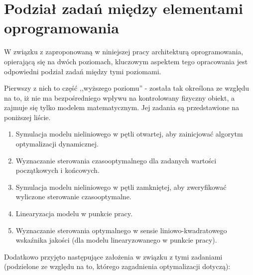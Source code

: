 \section{Podział zadań między elementami oprogramowania}
\label{sec:podzial-zadan}

W związku z zaproponowaną w niniejszej pracy architekturą oprogramowania, opierającą się na dwóch poziomach, kluczowym aspektem tego opracowania jest odpowiedni podział zadań między tymi poziomami.

Pierwszy z nich to część ,,wyższego poziomu'' - została tak określona ze względu na to, iż nie ma bezpośredniego wpływu na kontrolowany fizyczny obiekt, a zajmuje się tylko modelem matematycznym. Jej zadania są przedstawione na poniższej liście.

\begin{enumerate}
    \item Symulacja modelu nieliniowego w pętli otwartej, aby zainicjować algorytm optymalizacji dynamicznej.
    \item Wyznaczanie sterowania czasooptymalnego dla zadanych wartości początkowych i końcowych.
    \item Symulacja modelu nieliniowego w pętli zamkniętej, aby zweryfikować wyliczone sterowanie czasooptymalne.
    \item Linearyzacja modelu w punkcie pracy.
    \item Wyznaczanie sterowania optymalnego w sensie liniowo-kwadratowego wskaźnika jakości (dla modelu linearyzowanego w punkcie pracy).
\end{enumerate}

Dodatkowo przyjęto następujące założenia w związku z tymi zadaniami (podzielone ze względu na to, którego zagadnienia optymalizacji dotyczą):

